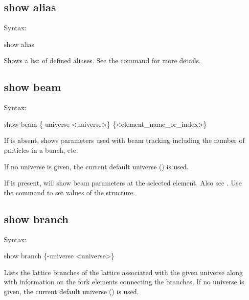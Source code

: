 {{{{{{{{%


\subsection{show alias}
\label{s:show.alias}

Syntax:
\begin{example}
  show alias
\end{example}

Shows a list of defined aliases. See the  command for more details.


\subsection{show beam}
\label{s:show.beam}

Syntax:
\begin{example}
  show beam \{-universe <universe>\} \{<element_name_or_index>\}
\end{example}

If  is absent,  shows parameters used with beam tracking
including the number of particles in a bunch, etc. 

If no universe is given, the current default universe () is used.

If  is present,  will show beam parameters at the selected
element. Also see .  Use the  command to set values of the
 structure.


\subsection{show branch}
\label{s:show.branch}

Syntax:
\begin{example}
  show branch \{-universe <universe>\}
\end{example}

Lists the lattice branches of the lattice associated with the given universe along with information
on the fork elements connecting the branches.  If no universe is given, the current default universe
() is used.

}}}}}}}}
